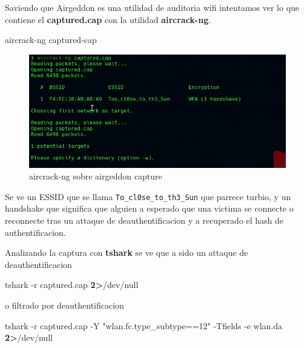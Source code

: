 \documentclass{assets/ipesethesis}
\newenvironment{Shaded}{\begin{snugshade}}{\end{snugshade}}
\newcommand{\ExtensionTok}[1]{#1}
\newcommand{\NormalTok}[1]{#1}
\newcommand{\OperatorTok}[1]{\textcolor[rgb]{0.81,0.36,0.00}{\textbf{#1}}}
\newcommand{\StringTok}[1]{\textcolor[rgb]{0.31,0.60,0.02}{#1}}
\begin{document}
Saviendo que Airgeddon es una utilidad de auditoria wifi intentamos ver lo que contiene el \textbf{captured.cap} con la utilidad \textbf{aircrack-ng}.

\begin{Shaded}
\begin{Highlighting}[]
\ExtensionTok{aircrack-ng}\NormalTok{ captured-cap}
\end{Highlighting}
\end{Shaded}

\begin{figure}
\includegraphics[width=0.9\linewidth]{images/aircrack-airgeddon} \caption{aircrack-ng sobre airgeddon capture}\label{fig:unnamed-chunk-3}
\end{figure}

Se ve un ESSID que se llama \texttt{To\_cl0se\_to\_th3\_Sun} que parrece turbio, y un handshake que significa que alguien a esperado que una victima se connecte
o reconnecte tras un attaque de deauthentificacion y a recuperado el hash de authentificacion.

Analizando la captura con \textbf{tshark} se ve que a sido un attaque de deauthentificacion

\begin{Shaded}
\begin{Highlighting}[]
\ExtensionTok{tshark}\NormalTok{ -r captured.cap }\OperatorTok{2>}\NormalTok{/dev/null}
\end{Highlighting}
\end{Shaded}

o filtrado por deauthentificacion

\begin{Shaded}
\begin{Highlighting}[]
\ExtensionTok{tshark}\NormalTok{ -r captured.cap -Y }\StringTok{"wlan.fc.type_subtype==12"}\NormalTok{ -Tfields -e wlan.da }\OperatorTok{2>}\NormalTok{/dev/null}
\end{Highlighting}
\end{Shaded}
\end{document}
